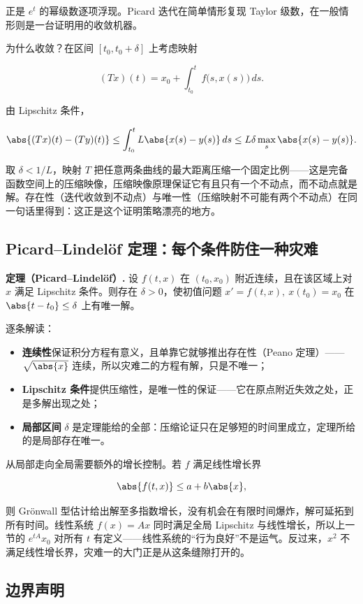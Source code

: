 正是 \(e^t\) 的幂级数逐项浮现。Picard 迭代在简单情形复现 Taylor 级数，在一般情形则是一台证明用的收敛机器。

为什么收敛？在区间 \([t_0,t_0+\delta]\) 上考虑映射

\[
(Tx)(t)=x_0+\int_{t_0}^{t}f\bigl(s,x(s)\bigr)\,ds.
\]

由 Lipschitz 条件，

\[
\abs{(Tx)(t)-(Ty)(t)}
\le\int_{t_0}^{t}L\abs{x(s)-y(s)}\,ds
\le L\delta\max_s\abs{x(s)-y(s)}.
\]

取 \(\delta<1/L\)，映射 \(T\) 把任意两条曲线的最大距离压缩一个固定比例——这是完备函数空间上的压缩映像，压缩映像原理保证它有且只有一个不动点，而不动点就是解。存在性（迭代收敛到不动点）与唯一性（压缩映射不可能有两个不动点）在同一句话里得到：这正是这个证明策略漂亮的地方。

\subsection{Picard--Lindelöf 定理：每个条件防住一种灾难}

\textbf{定理（Picard--Lindelöf）.} 设 \(f(t,x)\) 在 \((t_0,x_0)\) 附近连续，且在该区域上对 \(x\) 满足 Lipschitz 条件。则存在 \(\delta>0\)，使初值问题 \(x'=f(t,x),\ x(t_0)=x_0\) 在 \(\abs{t-t_0}\le\delta\) 上有唯一解。

逐条解读：

\begin{itemize}
\tightlist
\item
  \textbf{连续性}保证积分方程有意义，且单靠它就够推出存在性（Peano 定理）——\(\sqrt{\abs{x}}\) 连续，所以灾难二的方程有解，只是不唯一；
\item
  \textbf{Lipschitz 条件}提供压缩性，是唯一性的保证——它在原点附近失效之处，正是多解出现之处；
\item
  \textbf{局部区间} \(\delta\) 是定理能给的全部：压缩论证只在足够短的时间里成立，定理所给的是局部存在唯一。
\end{itemize}

从局部走向全局需要额外的增长控制。若 \(f\) 满足线性增长界

\[
\abs{f(t,x)}\le a+b\abs{x},
\]

则 Grönwall 型估计给出解至多指数增长，没有机会在有限时间爆炸，解可延拓到所有时间。线性系统 \(f(x)=Ax\) 同时满足全局 Lipschitz 与线性增长，所以上一节的 \(e^{tA}x_0\) 对所有 \(t\) 有定义——线性系统的``行为良好''不是运气。反过来，\(x^2\) 不满足线性增长界，灾难一的大门正是从这条缝隙打开的。

\subsection{边界声明}

